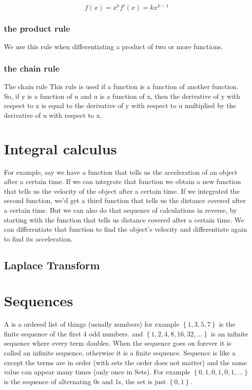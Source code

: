 \[
f(x) = x^k 
f'(x) = kx^{k-1}
\]

\subsubsection{the product rule}
We use this rule when differentiating a product of two or more functions.

\subsubsection{the chain rule}
The chain rule This rule is used if a function is a function of another function. So, if y is a function of u and u is a function of x, then the derivative of y with respect to x is equal to the derivative of y with respect to u multiplied by the derivative of u with respect to x,

\section{Integral calculus}
For example, say we have a function that tells us the acceleration of an object after a certain time. If we can integrate that function we obtain a new function that tells us the velocity of the object after a certain time. If we integrated the second function, we'd get a third function that tells us the distance covered after a certain time. But we can also do that sequence of calculations in reverse, by starting with the function that tells us distance covered after a certain time. We can differentiate that function to find the object's velocity and differentiate again to find its acceleration.

\subsection{Laplace Transform}


\section{Sequences}
A  is a ordered list of things (usually numbers) for example $\left\{1, 3, 5, 7\right\}$ is the finite sequence of the first $4$ odd numbers. and $\left\{1, 2, 4, 8, 16, 32, ...\right\}$ is an infinite sequence where every term doubles. When the sequence goes on forever it is called an infinite sequence, otherwise it is a finite sequence. Sequence is like a  except the terms are in order (with sets the order does not matter) and the same value can appear many times (only once in Sets). For example $\left\{0, 1, 0, 1, 0, 1, ...\right\}$ is the sequence of alternating $0$s and $1$s, the set is just $\left\{0,1\right\}$.

